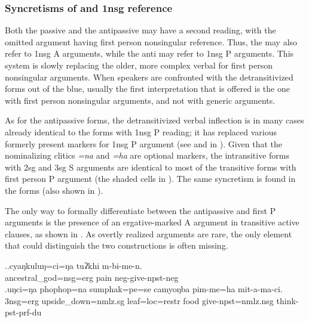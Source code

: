 \subsubsection{Syncretisms of  and {\sc 1nsg} re\-fe\-rence}\label{detrans-polite}

Both the passive and the antipassive may have a second reading, with the omitted argument having first person nonsingular reference. Thus, the  may also refer to 1{\sc nsg} A arguments, while the anti may refer to 1{\sc nsg}  P arguments. This system is slowly replacing the older, more complex verbal  for first person nonsingular arguments. When speakers are confronted with the detransitivized forms out of the blue, usually the first interpretation that is offered is the one with first person nonsingular arguments, and not with generic arguments. 

As for the antipassive forms, the detransitivized verbal inflection is in many cases already identical to the forms with 1{\sc nsg}  P reading; it has replaced various formerly present markers for 1{\sc nsg}  P argument (see  and  in ).
Given that the nominalizing clitics \emph{=na} and \emph{=ha} are optional markers, the intransitive forms with 2sg and 3sg S arguments are identical to most of the transitive forms with first person P argument (the shaded cells in ). The same syncretism is found in the  forms (also shown in ).


The only way to formally differentiate between the antipassive and first   P arguments is the presence of an ergative-marked A argument in transitive active clauses, as shown in \Next. As overtly realized arguments are rare, the only  element that could distinguish the two constructions is often missing.  

\ex.\ag.cyaŋkuluŋ=ci=ŋa     tuʔkhi m-bi-me-n.\\
ancestral\_god{\sc =nsg=erg} pain {\sc neg-}give{\sc [3A;1.P]-npst-neg}\\
\bg.uŋci=ŋa   phophop=na  sumphak=pe=se   camyoŋba pim-me=ha mit-a-ma-ci.\\
{\sc 3nsg=erg} upside\_down{\sc =nmlz.sg} leaf{\sc =loc=restr} food  give{\sc [3A;1.P]-npst=nmlz.nsg} think{\sc -pst-prf-du}\\


